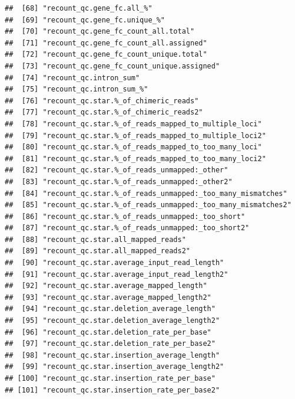 \documentclass[
]{article}
\begin{document}
\begin{verbatim}
##  [68] "recount_qc.gene_fc.all_%"                                          
##  [69] "recount_qc.gene_fc.unique_%"                                       
##  [70] "recount_qc.gene_fc_count_all.total"                                
##  [71] "recount_qc.gene_fc_count_all.assigned"                             
##  [72] "recount_qc.gene_fc_count_unique.total"                             
##  [73] "recount_qc.gene_fc_count_unique.assigned"                          
##  [74] "recount_qc.intron_sum"                                             
##  [75] "recount_qc.intron_sum_%"                                           
##  [76] "recount_qc.star.%_of_chimeric_reads"                               
##  [77] "recount_qc.star.%_of_chimeric_reads2"                              
##  [78] "recount_qc.star.%_of_reads_mapped_to_multiple_loci"                
##  [79] "recount_qc.star.%_of_reads_mapped_to_multiple_loci2"               
##  [80] "recount_qc.star.%_of_reads_mapped_to_too_many_loci"                
##  [81] "recount_qc.star.%_of_reads_mapped_to_too_many_loci2"               
##  [82] "recount_qc.star.%_of_reads_unmapped:_other"                        
##  [83] "recount_qc.star.%_of_reads_unmapped:_other2"                       
##  [84] "recount_qc.star.%_of_reads_unmapped:_too_many_mismatches"          
##  [85] "recount_qc.star.%_of_reads_unmapped:_too_many_mismatches2"         
##  [86] "recount_qc.star.%_of_reads_unmapped:_too_short"                    
##  [87] "recount_qc.star.%_of_reads_unmapped:_too_short2"                   
##  [88] "recount_qc.star.all_mapped_reads"                                  
##  [89] "recount_qc.star.all_mapped_reads2"                                 
##  [90] "recount_qc.star.average_input_read_length"                         
##  [91] "recount_qc.star.average_input_read_length2"                        
##  [92] "recount_qc.star.average_mapped_length"                             
##  [93] "recount_qc.star.average_mapped_length2"                            
##  [94] "recount_qc.star.deletion_average_length"                           
##  [95] "recount_qc.star.deletion_average_length2"                          
##  [96] "recount_qc.star.deletion_rate_per_base"                            
##  [97] "recount_qc.star.deletion_rate_per_base2"                           
##  [98] "recount_qc.star.insertion_average_length"                          
##  [99] "recount_qc.star.insertion_average_length2"                         
## [100] "recount_qc.star.insertion_rate_per_base"                           
## [101] "recount_qc.star.insertion_rate_per_base2"                          

\end{verbatim}
\end{document}
